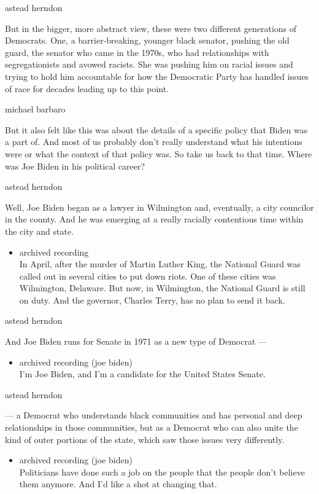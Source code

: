 astead herndon

But in the bigger, more abstract view, these were two different
generations of Democrats. One, a barrier-breaking, younger black
senator, pushing the old guard, the senator who came in the 1970s, who
had relationships with segregationists and avowed racists. She was
pushing him on racial issues and trying to hold him accountable for how
the Democratic Party has handled issues of race for decades leading up
to this point.

michael barbaro

But it also felt like this was about the details of a specific policy
that Biden was a part of. And most of us probably don't really
understand what his intentions were or what the context of that policy
was. So take us back to that time. Where was Joe Biden in his political
career?

astead herndon

Well, Joe Biden began as a lawyer in Wilmington and, eventually, a city
councilor in the county. And he was emerging at a really racially
contentious time within the city and state.

\begin{itemize}
\tightlist
\item
  archived recording\\
  In April, after the murder of Martin Luther King, the National Guard
  was called out in several cities to put down riots. One of these
  cities was Wilmington, Delaware. But now, in Wilmington, the National
  Guard is still on duty. And the governor, Charles Terry, has no plan
  to send it back.
\end{itemize}

astead herndon

And Joe Biden runs for Senate in 1971 as a new type of Democrat ---

\begin{itemize}
\tightlist
\item
  archived recording (joe biden)\\
  I'm Joe Biden, and I'm a candidate for the United States Senate.
\end{itemize}

astead herndon

--- a Democrat who understands black communities and has personal and
deep relationships in those communities, but as a Democrat who can also
unite the kind of outer portions of the state, which saw those issues
very differently.

\begin{itemize}
\tightlist
\item
  archived recording (joe biden)\\
  Politicians have done such a job on the people that the people don't
  believe them anymore. And I'd like a shot at changing that.
\end{itemize}


